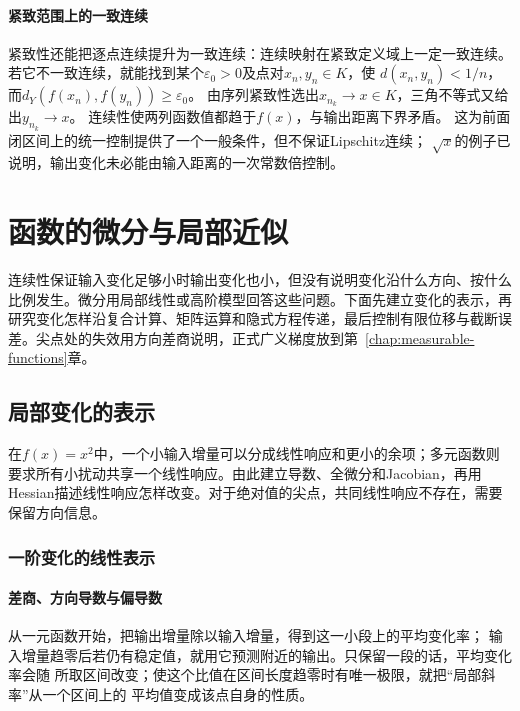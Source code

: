 \paragraph{紧致范围上的一致连续}

紧致性还能把逐点连续提升为一致连续：连续映射在紧致定义域上一定一致连续。
若它不一致连续，就能找到某个$\varepsilon_0>0$及点对$x_n,y_n\in K$，使
$d(x_n,y_n)<1/n$，而$d_Y(f(x_n),f(y_n))\geq\varepsilon_0$。
由序列紧致性选出$x_{n_k}\to x\in K$，三角不等式又给出$y_{n_k}\to x$。
连续性使两列函数值都趋于$f(x)$，与输出距离下界矛盾。
这为前面闭区间上的统一控制提供了一个一般条件，但不保证Lipschitz连续；
$\sqrt{x}$的例子已说明，输出变化未必能由输入距离的一次常数倍控制。

\section{函数的微分与局部近似}
\label{sec:analysis-local-models}

连续性保证输入变化足够小时输出变化也小，但没有说明变化沿什么方向、按什么比例发生。微分用局部线性或高阶模型回答这些问题。下面先建立变化的表示，再研究变化怎样沿复合计算、矩阵运算和隐式方程传递，最后控制有限位移与截断误差。尖点处的失效用方向差商说明，正式广义梯度放到第~\ref{chap:measurable-functions}章。

\subsection{局部变化的表示}
\label{sec:analysis-derivatives-linear-approximation}

在$f(x)=x^2$中，一个小输入增量可以分成线性响应和更小的余项；多元函数则要求所有小扰动共享一个线性响应。由此建立导数、全微分和Jacobian，再用Hessian描述线性响应怎样改变。对于绝对值的尖点，共同线性响应不存在，需要保留方向信息。

\subsubsection{一阶变化的线性表示}

\paragraph{差商、方向导数与偏导数}

从一元函数开始，把输出增量除以输入增量，得到这一小段上的平均变化率；
输入增量趋零后若仍有稳定值，就用它预测附近的输出。只保留一段的话，平均变化率会随
所取区间改变；使这个比值在区间长度趋零时有唯一极限，就把“局部斜率”从一个区间上的
平均值变成该点自身的性质。

